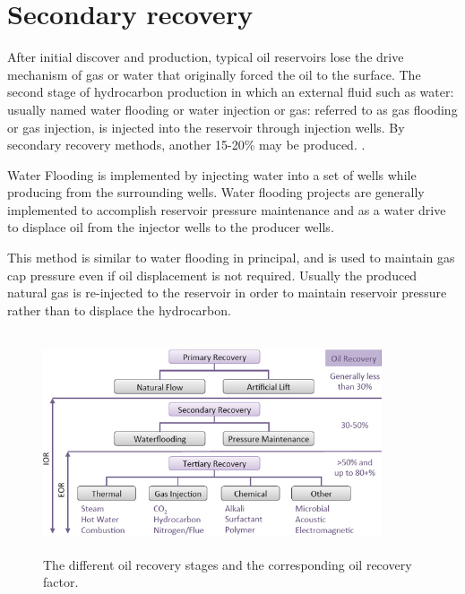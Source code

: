 \section{Secondary recovery}
After initial discover and production, typical oil reservoirs lose the drive 
mechanism of gas or water that originally forced the oil to the surface. The 
second stage of hydrocarbon production in which an external fluid such as water: 
usually named water flooding or water injection or gas: referred to as gas 
flooding or gas injection, is injected into the reservoir through injection 
wells. By secondary recovery methods, another 15-20\% may be produced.
\citep{Fleshman}.
\begin{description}[style=nextline]
\item[\textbf{Water flooding}]
Water Flooding is implemented by injecting water into a set of 
wells while producing from the surrounding wells. Water flooding projects are 
generally implemented to accomplish reservoir pressure maintenance and as a water drive to 
displace oil from the injector wells to the producer wells\citep{Fleshman}.
\item[\textbf{Gas flooding}]
This method is similar to water flooding in principal, and is used 
to maintain gas cap pressure even if oil displacement is not required. Usually 
the produced natural gas is re-injected to the reservoir in order to maintain 
reservoir pressure rather than to displace the hydrocarbon. 
\begin{figure}[ht]
\begin{center}
      \includegraphics[width=10cm, height=6.5cm]{figures/OilRecoveryStages.png}
       \end{center}
     \caption{The different oil recovery stages and the corresponding oil recovery
factor.}
  \label{fig:OilRecoveryStages}
\end{figure}

\end{description}

